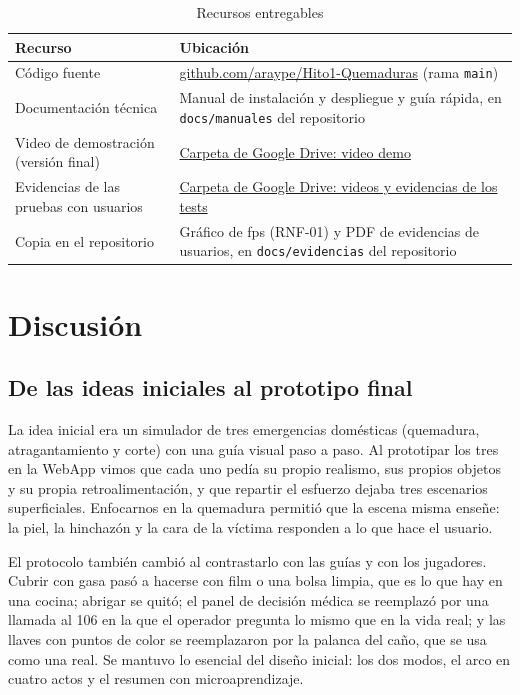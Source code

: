 \documentclass[11pt,a4paper]{article}
\begin{document}
\begin{table}[htbp]
\centering
\caption{Recursos entregables}
\label{tab:entregables}
\small
\begin{tabularx}{\linewidth}{@{}L{5.2cm} Y@{}}
\toprule
\textbf{Recurso} & \textbf{Ubicación} \\
\midrule
Código fuente & \href{https://github.com/araype/Hito1-Quemaduras}{github.com/araype/Hito1-Quemaduras} (rama \texttt{main}) \\
Documentación técnica & Manual de instalación y despliegue y guía rápida, en \texttt{docs/manuales} del repositorio \\
Video de demostración (versión final) & \href{https://drive.google.com/drive/folders/1LthRBOaIAnPZPQVPgEad9M71Vj7n-8rp?usp=sharing}{Carpeta de Google Drive: video demo} \\
Evidencias de las pruebas con usuarios & \href{https://drive.google.com/drive/folders/1MNOp0vc79394Pmh6ESpHtdbq6dn6XHvg?usp=sharing}{Carpeta de Google Drive: videos y evidencias de los tests} \\
Copia en el repositorio & Gráfico de fps (RNF-01) y PDF de evidencias de usuarios, en \texttt{docs/evidencias} del repositorio \\
\bottomrule
\end{tabularx}
\end{table}


\section{Discusión}

\subsection{De las ideas iniciales al prototipo final}
La idea inicial era un simulador de tres emergencias domésticas (quemadura, atragantamiento y corte) con una guía visual paso a paso. Al prototipar los tres en la WebApp vimos que cada uno pedía su propio realismo, sus propios objetos y su propia retroalimentación, y que repartir el esfuerzo dejaba tres escenarios superficiales. Enfocarnos en la quemadura permitió que la escena misma enseñe: la piel, la hinchazón y la cara de la víctima responden a lo que hace el usuario.

El protocolo también cambió al contrastarlo con las guías y con los jugadores. Cubrir con gasa pasó a hacerse con film o una bolsa limpia, que es lo que hay en una cocina; abrigar se quitó; el panel de decisión médica se reemplazó por una llamada al 106 en la que el operador pregunta lo mismo que en la vida real; y las llaves con puntos de color se reemplazaron por la palanca del caño, que se usa como una real. Se mantuvo lo esencial del diseño inicial: los dos modos, el arco en cuatro actos y el resumen con microaprendizaje.
\end{document}
